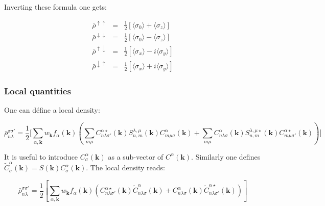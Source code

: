 \documentclass{article}
\begin{document}
\noindent
Inverting these formula one gets:

\[ \begin{array}{lcl} 
 \bar{\rho}^{\uparrow \uparrow}      &=&  \displaystyle \frac{1}{2}[\langle \sigma_0\rangle+  \langle\sigma_z\rangle]     \\ 
 \bar{\rho}^{\downarrow \downarrow}  &=&  \displaystyle \frac{1}{2}[\langle\sigma_0\rangle-  \langle\sigma_z\rangle]   \\ 
 \bar{\rho}^{\uparrow \downarrow}    &=&  \displaystyle \frac{1}{2}[\langle\sigma_x\rangle- i\langle\sigma_y\rangle]   \\
 \bar{\rho}^{\downarrow \uparrow}    &=&  \displaystyle \frac{1}{2}[\langle\sigma_x\rangle+ i\langle\sigma_y\rangle]   
\end{array}
\]




\subsubsection{Local quantities}

\noindent
One can défine a local density:

\[ \bar{\rho}^{\sigma \sigma'}_{n \lambda}=\frac{1}{2}\Bigg[\sum_{\alpha,\mathbf{k}} w_{\mathbf{k}}
f_{\alpha}(\mathbf{k})
\left(\sum_{ m \mu} 
C_{n \lambda \sigma'}^{\alpha \star}(\mathbf{k}) 
S_{n,m}^{\lambda,\mu}(\mathbf{k})C_{m\mu \sigma}^{\alpha}(\mathbf{k})+
 \sum_{ m \mu} 
C_{n \lambda \sigma}^{\alpha}(\mathbf{k}) 
S_{n,m}^{\lambda,\mu \star}(\mathbf{k})C_{m \mu \sigma'}^{\alpha \star}(\mathbf{k}) \right) \Bigg]
 \]

\noindent
It is useful to introduce $C_{\sigma}^{\alpha}(\mathbf{k})$ as a sub-vector of
 $C^{\alpha}(\mathbf{k})$. Similarly one defines
 $\widetilde{C}_{\sigma}^{\alpha}(\mathbf{k})=S(\mathbf{k})C_{\sigma}^{\alpha}(\mathbf{k})$.
 The local density reads:
 
\[ \bar{\rho}^{\sigma \sigma'}_{n \lambda}=
\frac{1}{2}\left[\sum_{\alpha,\mathbf{k}} w_{\mathbf{k}}
f_{\alpha}(\mathbf{k}) 
  \left( C_{n \lambda \sigma'}^{\alpha \star}(\mathbf{k}) \widetilde{C}_{n \lambda \sigma}^{\alpha }(\mathbf{k})
+ C_{n \lambda \sigma}^{\alpha}(\mathbf{k}) \widetilde{C}_{n \lambda \sigma'}^{\alpha \star}(\mathbf{k}) \right)
\right]
 \] 
\end{document}
